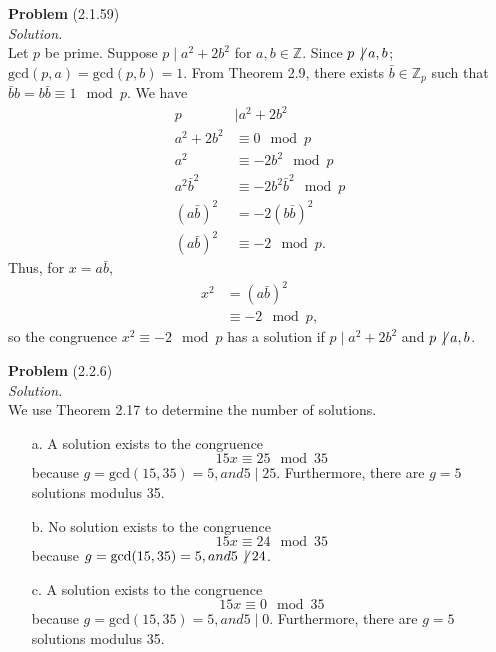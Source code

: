 \documentclass[12 pt]{amsart}
\begin{document}
  

\vfill
\newpage



\phantom{\quad} \vfill
\noindent
\textbf{Problem} (2.1.59) \\[4ex]
\emph{Solution.} \\[2ex]
  Let $p$ be prime.
  Suppose $p \mid a^2 + 2b^2$ for $a,b \in \mathbb{Z}$. 
  Since $p \not \, \mid a, b$; 
  $\text{gcd}(p, a) = \text{gcd}(p, b) = 1$.
  From Theorem 2.9, there exists $\bar{b} \in \mathbb{Z}_p$
  such that $\bar{b} b = b \bar{b} \equiv 1 \mod p$.
  We have
  \begin{align*}
    p &\mid a^2 + 2b^2 \\
    a^2 + 2b^2 &\equiv 0 \mod p \\
    a^2 &\equiv -2 b^2 \mod p \\
    a^2 \bar{b}^2 &\equiv -2 b^2 \bar{b}^2 \mod p \\
    \left( a \bar{b} \right)^2 &= -2 \left( b \bar{b} \right)^2 \\
    \left( a \bar{b} \right)^2 &\equiv -2 \mod p.
  \end{align*}
  Thus, for $x = a \bar{b}$, 
  \begin{align*}
    x^2 &= \left( a \bar{b} \right)^2 \\
        &\equiv -2 \mod p,
  \end{align*}
  so the congruence $x^2 \equiv -2 \mod p$ has a solution if
  $p \mid a^2 + 2b^2$ and $p \not \, \mid a,b$.
\vfill
\newpage



\phantom{\quad} \vfill
\noindent
\textbf{Problem} (2.2.6) \\[4ex]
\emph{Solution.} \\[2ex]
  We use Theorem 2.17 to determine the number of solutions.
	\begin{enumerate}
		\item[a.]
      A solution exists to the congruence 
      \[
        15 x \equiv 25 \mod 35
      \]
      because $g = \text{gcd}(15, 35) = 5, and 5 \mid 25$.
      Furthermore, there are $g = 5$ solutions modulus 35.
		\item[b.]
      No solution exists to the congruence
      \[
        15 x \equiv 24 \mod 35
      \]
      because $g = \text{gcd}(15, 35) = 5, and 5 \not \, \mid 24$.
		\item[c.]
      A solution exists to the congruence 
      \[
        15 x \equiv 0 \mod 35
      \]
      because $g = \text{gcd}(15, 35) = 5, and 5 \mid 0$.
      Furthermore, there are $g = 5$ solutions modulus 35.
	\end{enumerate}
\vfill
\newpage
\end{document}
